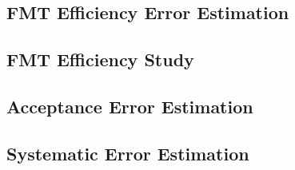 \subsection*{FMT Efficiency Error Estimation}


\subsection*{FMT Efficiency Study}


\subsection*{Acceptance Error Estimation}


\subsection*{Systematic Error Estimation}


% 

% 

% 
